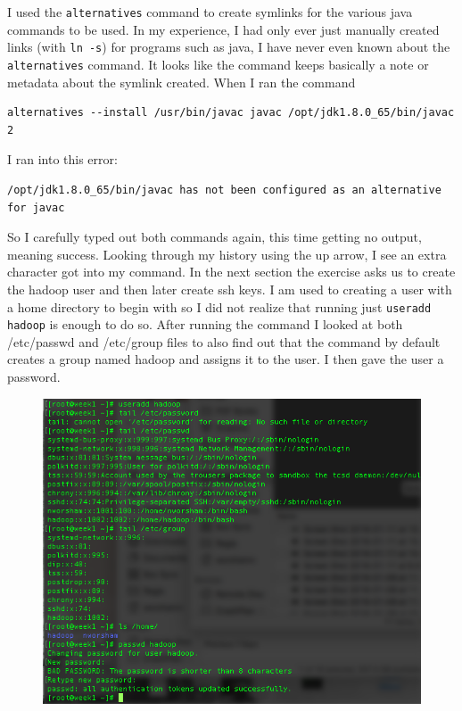 \documentclass[10pt]{article}
\begin{document}
\par
I used the \verb|alternatives| command to create symlinks for the various java commands to be used. In my experience, I had only ever just manually created links (with \verb|ln -s|) for programs such as java, I have never even known about the \verb|alternatives| command. It looks like the command keeps basically a note or metadata about the symlink created. When I ran the command 
\begin{verbatim}
alternatives --install /usr/bin/javac javac /opt/jdk1.8.0_65/bin/javac 2
\end{verbatim}
I ran into this error:
\begin{verbatim}
/opt/jdk1.8.0_65/bin/javac has not been configured as an alternative for javac
\end{verbatim}
So I carefully typed out both commands again, this time getting no output, meaning success. Looking through my history using the up arrow, I see an extra character got into my command. In the next section the exercise asks us to create the hadoop user and then later create ssh keys. I am used to creating a user with a home directory to begin with so I did not realize that running just \verb|useradd hadoop| is enough to do so. After running the command I looked at both /etc/passwd and /etc/group files to also find out that the command by default creates a group named hadoop and assigns it to the user.  I then gave the user a password.
\begin{figure}[!h]
\includegraphics[scale=0.37]{create_user.png}
\centering
\end{figure}\\
\end{document}
